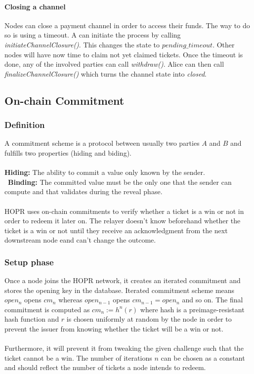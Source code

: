 \paragraph{Closing a channel}
Nodes can close a payment channel in order to access their funds. The way to do so is using a timeout.
A can initiate the process by calling \textit{initiateChannelClosure()}. This changes the state to $pending\_timeout$. Other nodes will have now time to claim not yet claimed tickets. Once the timeout is done, any of the involved parties can call \textit{withdraw()}. Alice can then call \textit{finalizeChannelClosure()} which turns the channel state into \textit{closed}.



\subsection{On-chain Commitment}

\subsubsection*{Definition}
A commitment scheme is a protocol between usually two parties $A$ and $B$ and fulfills two properties (hiding and biding).
\\~\\\textbf{Hiding:} The ability to commit a value only known by the sender.
\\~\textbf{Binding:} The committed value must be the only one that the sender can compute and that validates during the reveal phase.
\\~\\HOPR uses on-chain commitments to verify whether a ticket is a win or not in order to redeem it later on. The relayer doesn't know beforehand whether the ticket is a win or not until they receive an acknowledgment from the next downstream node eand can't change the outcome.
\subsubsection{Setup phase}
Once a node joins the HOPR network, it creates an iterated commitment and stores the opening key in the database.
Iterated commitment scheme means $open_n$ opens $cm_n$ whereas $open_{n-1}$ opens $cm_{n-1}=open_n$ and so on.
\newline The final commitment is computed as $cm_n:= h^n(r)$ where hash is a preimage-resistant hash function and
$r$ is chosen uniformly at random by the node in order to prevent the issuer from knowing whether the ticket will be a win or not.
\\~\\ Furthermore, it will prevent it from tweaking the given challenge such that the ticket cannot be a win.
The number of iterations $n$ can be chosen as a constant and should reflect the number of tickets a node intends to redeem.

